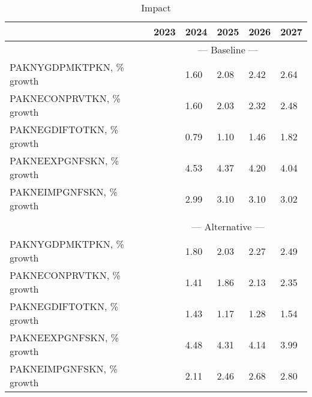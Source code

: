 \documentclass{article}
\begin{document}
\begin{table}
\caption{Impact}
\begin{tabular}{llllll}
\toprule
 & 2023 & 2024 & 2025 & 2026 & 2027 \\
\midrule
&\multicolumn{5}{c}{--- Baseline ---}                                                                                                     \\
PAKNYGDPMKTPKN, \% growth &                      &                 1.60 &                 2.08 &                 2.42 &                 2.64 \\
PAKNECONPRVTKN, \% growth &                      &                 1.60 &                 2.03 &                 2.32 &                 2.48 \\
PAKNEGDIFTOTKN, \% growth &                      &                 0.79 &                 1.10 &                 1.46 &                 1.82 \\
PAKNEEXPGNFSKN, \% growth &                      &                 4.53 &                 4.37 &                 4.20 &                 4.04 \\
PAKNEIMPGNFSKN, \% growth &                      &                 2.99 &                 3.10 &                 3.10 &                 3.02 \\
&\multicolumn{5}{c}{     }                                                                                                     \\
&\multicolumn{5}{c}{--- Alternative ---}                                                                                                     \\
PAKNYGDPMKTPKN, \% growth &                      &                 1.80 &                 2.03 &                 2.27 &                 2.49 \\
PAKNECONPRVTKN, \% growth &                      &                 1.41 &                 1.86 &                 2.13 &                 2.35 \\
PAKNEGDIFTOTKN, \% growth &                      &                 1.43 &                 1.17 &                 1.28 &                 1.54 \\
PAKNEEXPGNFSKN, \% growth &                      &                 4.48 &                 4.31 &                 4.14 &                 3.99 \\
PAKNEIMPGNFSKN, \% growth &                      &                 2.11 &                 2.46 &                 2.68 &                 2.80 \\

\end{tabular}
\end{table}
\end{document}
